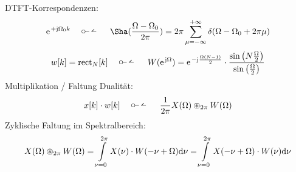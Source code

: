 \begin{Werkzeug}
DTFT-Korrespondenzen:
\begin{align}
\e^{+\im\Omega_0 k} \quad\dtft\quad \Sha(\frac{\Omega-\Omega_0}{2\pi})
= 2\pi \sum\limits_{\mu=-\infty}^{+\infty}
\delta(\Omega-\Omega_0 + 2\pi\mu)
\end{align}
%
\begin{equation}
w[k] = \mathrm{rect}_N[k]
\quad\dtft\quad
W(\e^{\im\Omega})=\e^{-\im\frac{\Omega(N-1)}{2}}\cdot\frac{\sin\left(N\frac{\Omega}{2}\right)}{\sin\left(\frac{\Omega}{2}\right)}
\end{equation}
%
Multiplikation / Faltung Dualität:
\begin{align}
x[k] \cdot w[k] \quad\dtft\quad \frac{1}{2\pi} X(\Omega) \circledast_{2\pi} W(\Omega)
\end{align}
%
Zyklische Faltung im Spektralbereich:
\begin{align}
X(\Omega) \circledast_{2\pi} W(\Omega) =
\int\limits_{\nu=0}^{2\pi} X(\nu) \cdot W(-\nu + \Omega) \mathrm{d} \nu =
\int\limits_{\nu=0}^{2\pi} X(-\nu+\Omega) \cdot W(\nu) \mathrm{d} \nu
\end{align}
\end{Werkzeug}
